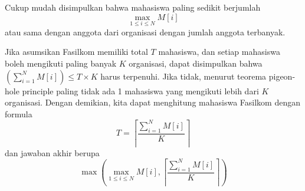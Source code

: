 \documentclass[../main_editorial.tex]{subfiles} %
\begin{document}
Cukup mudah disimpulkan bahwa mahasiswa paling sedikit berjumlah $$\max_{1 \le i \le N} M[i]$$ atau sama dengan anggota dari organisasi dengan jumlah anggota terbanyak.

Jika asumsikan Fasilkom memiliki total $T$ mahasiswa, dan setiap mahasiswa boleh mengikuti paling banyak $K$ organisasi, dapat disimpulkan bahwa $(\sum_{i=1}^N M[i]) \le T \times K$ harus terpenuhi. Jika tidak, menurut teorema pigeon-hole principle paling tidak ada 1 mahasiswa yang mengikuti lebih dari $K$ organisasi. Dengan demikian, kita dapat menghitung mahasiswa Fasilkom dengan formula $$T = \left \lceil{\frac{\sum_{i=1}^N M[i]}{K}}\right \rceil$$ dan jawaban akhir berupa $$\max \left ( \max_{1 \le i \le N} M[i],\left \lceil{\frac{\sum_{i=1}^N M[i]}{K}}\right \rceil \right )$$
\end{document}
